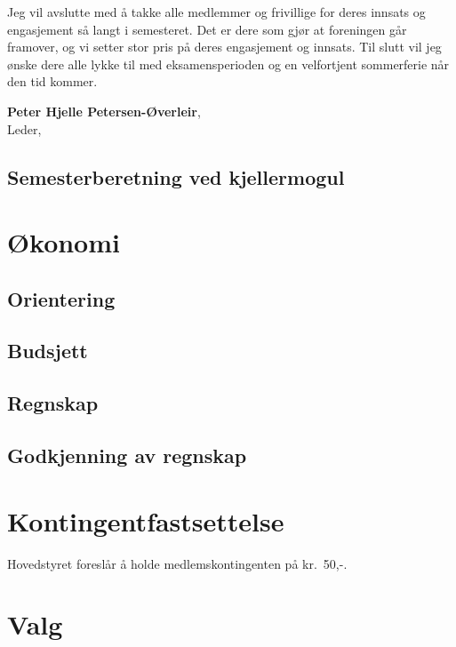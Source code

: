 \documentclass[10pt,norsk,a4paper,usenames,dvipsnames]{article}
\begin{document}
\begin{multicols}{2}
    Jeg vil avslutte med å takke alle medlemmer og frivillige for deres innsats og engasjement så langt i semesteret. Det er dere som gjør at foreningen går framover, og vi setter stor pris på deres engasjement og innsats. Til slutt vil jeg ønske dere alle lykke til med eksamensperioden og en velfortjent sommerferie når den tid kommer.

    \end{multicols}

    \textbf{Peter Hjelle Petersen-Øverleir}, \\
    Leder, \date{\emph{03. mai 2023}}


    \subsection{Semesterberetning ved kjellermogul}

\section{Økonomi}

    \subsection{Orientering}
    \subsection{Budsjett}
    \subsection{Regnskap}
    \subsection{Godkjenning av regnskap}

\section{Kontingentfastsettelse}
    Hovedstyret foreslår å holde medlemskontingenten på kr.~50,-.


\section{Valg}
\end{document}
